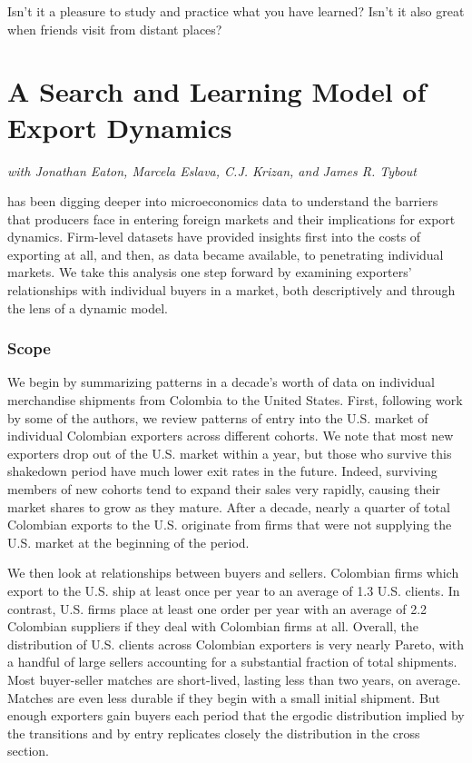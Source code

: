 \begin{savequote}[75mm]
Isn't it a pleasure to study and practice what you have learned?  Isn't it also great when friends visit from distant places?
\end{savequote}

\chapter{A Search and Learning Model of Export Dynamics}
\hfill{} \emph{with Jonathan Eaton, Marcela Eslava, C.J. Krizan, and James R. Tybout}

 has been digging deeper into microeconomics data to
understand the barriers that producers face in entering foreign markets and
their implications for export dynamics. Firm-level datasets have provided
insights first into the costs of exporting at all, and then, as data became
available, to penetrating individual markets. We take this analysis one step
forward by examining exporters' relationships with individual buyers in a
market, both descriptively and through the lens of a dynamic model.

\subsection{Scope}

We begin by summarizing patterns in a decade's worth of data on individual
merchandise shipments from Colombia to the United States. First, following
work by some of the authors,\citep{eaton2008nthe} we review patterns of
entry into the U.S. market of individual Colombian exporters across
different cohorts. We note that most new exporters drop out of the U.S.
market within a year, but those who survive this shakedown period have much
lower exit rates in the future. Indeed, surviving members of new cohorts
tend to expand their sales very rapidly, causing their market shares to grow
as they mature. After a decade, nearly a quarter of total Colombian exports
to the U.S. originate from firms that were not supplying the U.S. market at
the beginning of the period.

We then look at relationships between buyers and sellers. Colombian firms
which export to the U.S. ship at least once per year to an average of 1.3
U.S. clients. In contrast, U.S. firms place at least one order per year with
an average of 2.2 Colombian suppliers if they deal with Colombian firms at
all. Overall, the distribution of U.S. clients across Colombian exporters is
very nearly Pareto, with a handful of large sellers accounting for a
substantial fraction of total shipments. Most buyer-seller matches are
short-lived, lasting less than two years, on average. Matches are even less
durable if they begin with a small initial shipment. But enough exporters
gain buyers each period that the ergodic distribution implied by the
transitions and by entry replicates closely the distribution in the cross
section.

